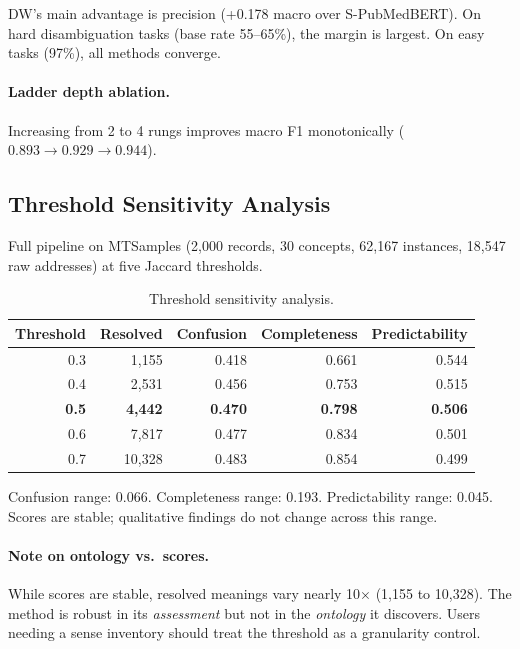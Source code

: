 \documentclass[11pt,a4paper]{article}
\begin{document}
DW's main advantage is precision (+0.178 macro over S-PubMedBERT). On hard disambiguation tasks (base rate 55--65\%), the margin is largest. On easy tasks (97\%), all methods converge.

\paragraph{Ladder depth ablation.} Increasing from 2 to 4 rungs improves macro F1 monotonically ($0.893 \to 0.929 \to 0.944$).

\subsection{Threshold Sensitivity Analysis}
\label{sec:threshold}

Full pipeline on MTSamples (2,000 records, 30 concepts, 62,167 instances, 18,547 raw addresses) at five Jaccard thresholds.

\begin{table}[h]
\centering
\small
\begin{tabular}{rrrrr}
\toprule
Threshold & Resolved & Confusion & Completeness & Predictability \\
\midrule
0.3 & 1,155 & 0.418 & 0.661 & 0.544 \\
0.4 & 2,531 & 0.456 & 0.753 & 0.515 \\
\textbf{0.5} & \textbf{4,442} & \textbf{0.470} & \textbf{0.798} & \textbf{0.506} \\
0.6 & 7,817 & 0.477 & 0.834 & 0.501 \\
0.7 & 10,328 & 0.483 & 0.854 & 0.499 \\
\bottomrule
\end{tabular}
\caption{Threshold sensitivity analysis.}
\label{tab:threshold}
\end{table}

Confusion range: 0.066. Completeness range: 0.193. Predictability range: 0.045. Scores are stable; qualitative findings do not change across this range.

\paragraph{Note on ontology vs.\ scores.} While scores are stable, resolved meanings vary nearly 10$\times$ (1,155 to 10,328). The method is robust in its \emph{assessment} but not in the \emph{ontology} it discovers. Users needing a sense inventory should treat the threshold as a granularity control.
\end{document}
